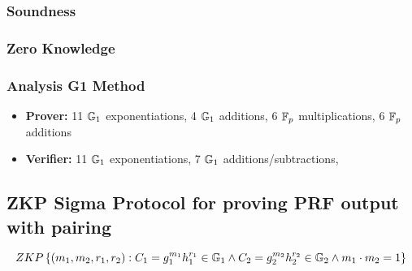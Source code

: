 \subsubsection{Soundness}

\subsubsection{Zero Knowledge}

\subsubsection{Analysis G1 Method}
\begin{itemize}
    \item \textbf{Prover:} 11 $\mathbb{G}_1$ exponentiations, 4 $\mathbb{G}_1$ additions, 6 $\mathbb{F}_p$ multiplications, 6 $\mathbb{F}_p$ additions
    \item \textbf{Verifier:} 11 $\mathbb{G}_1$ exponentiations, 7 $\mathbb{G}_1$ additions/subtractions, 
\end{itemize}




\newpage
\subsection{ZKP Sigma Protocol for proving PRF output with pairing}

\[
ZKP
    \left\{ 
    (m_1, m_2, r_1, r_2): C_1 = g_1^{m_1}h_1^{r_1} \in \mathbb{G}_1 \wedge C_2 = g_2^{m_2}h_2^{r_2} \in \mathbb{G}_2 \wedge m_1 \cdot m_2 = 1
    \right\}
\]



